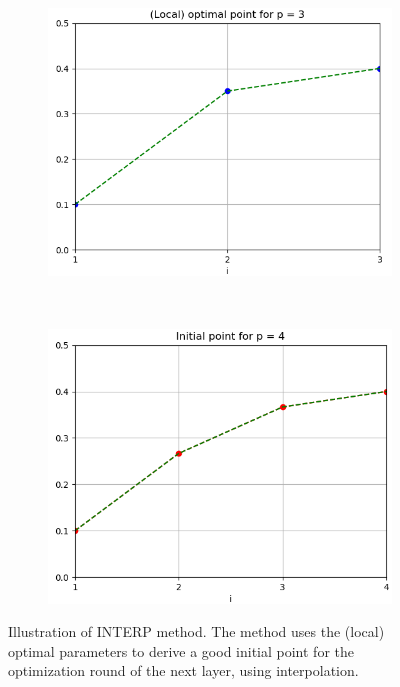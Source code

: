 \begin{figure}[H]
	\centering
	\begin{subfigure}[t]{0.45\textwidth}
	\centering
	\includegraphics[width=\textwidth]{figures/heuristic_optimal_params.png}
	\end{subfigure}%
	~
	\begin{subfigure}[t]{0.45\textwidth}
		\centering
		\includegraphics[width=\textwidth]{figures/heuristic_initial_params.png}
	\end{subfigure}%
	\caption{Illustration of INTERP method. The method uses the (local) optimal parameters to derive a good initial point for the optimization round of the next layer, using interpolation.}
	\label{fig:interp-example}
\end{figure}
